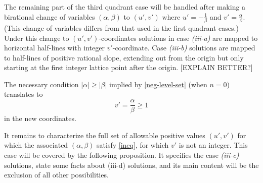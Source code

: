 \documentclass[12pt,letterpaper, reqno]{amsart}
\theoremstyle{definition}
\theoremstyle{remark}
\newcommand{\RR}{\ensuremath{\mathbb{R}}}
\newcommand{\uu}{{u'}}
\newcommand{\vv}{{v'}}
\begin{document}
\medskip


The  remaining part of the third quadrant case will be handled after making a 
birational change of variables
$(\alpha, \beta)$ to $(\uu, \vv)$ where 
$\uu= -\frac{1}{\beta}$ and $\vv= \frac{\alpha}{\beta}$.
(This change of variables differs from that used in the first quadrant cases.)
Under this change to $(\uu,\vv)$-coordinates  solutions  in case {\it (iii-a)} 
are mapped to horizontal half-lines with integer $\vv$-coordinate.
Case {\it (iii-b)} solutions are  mapped to half-lines of positive rational slope, extending out from the origin but only starting at the first integer lattice point after the origin. [EXPLAIN BETTER?]

The  necessary condition $|\alpha|\geq |\beta|$ implied by \eqref{neg-level-set} (when $n=0$) translates to
\begin{equation}\label{necessary}
 \vv= \frac{\alpha}{\beta} \geq 1
\end{equation}
in the new coordinates.

It remains to characterize the full  set of allowable  positive values $(\uu, \vv)$
for which the associated $(\alpha, \beta)$ satisfy \eqref{ineq}, for which $\vv$ is not an integer.
This case will be covered by the following proposition. It specifies the case {\em (iii-c)}  solutions,
state some facts about (iii-d) solutions, and its main content will be the exclusion of all other possibilities. 
 
\end{document}
